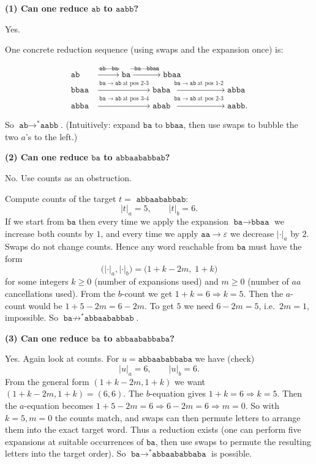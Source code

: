 \documentclass[12pt]{article}
\begin{document}
\bigskip

\textbf{(1) Can one reduce \(\texttt{ab}\) to \(\texttt{aabb}\)?}

Yes.

One concrete reduction sequence (using swaps and the expansion once) is:

\[
\begin{aligned}
\texttt{ab}
&\xrightarrow{\ \texttt{ab}\to\texttt{ba}\ } \texttt{ba} 
\xrightarrow{\ \texttt{ba}\to\texttt{bbaa}\ } \texttt{bbaa}\\
\texttt{bbaa}
&\xrightarrow{\ \texttt{ba}\to\texttt{ab}\ \text{at pos }2\text{-}3\ } \texttt{baba}
\xrightarrow{\ \texttt{ba}\to\texttt{ab}\ \text{at pos }1\text{-}2\ } \texttt{abba}\\
\texttt{abba}
&\xrightarrow{\ \texttt{ba}\to\texttt{ab}\ \text{at pos }3\text{-}4\ } \texttt{abab}
\xrightarrow{\ \texttt{ba}\to\texttt{ab}\ \text{at pos }2\text{-}3\ } \texttt{aabb}.
\end{aligned}
\]

So \(\texttt{ab}\to^{*}\texttt{aabb}\). (Intuitively: expand \(\texttt{ba}\) to \(\texttt{bbaa}\), then use swaps to bubble the two \(a\)'s to the left.)

\bigskip

\textbf{(2) Can one reduce \(\texttt{ba}\) to \(\texttt{abbaababbab}\)?}

No. Use counts as an obstruction.

Compute counts of the target \(t=\) \(\texttt{abbaababbab}\):
\[
|t|_a=5,\qquad |t|_b=6.
\]
If we start from \(\texttt{ba}\) then every time we apply the expansion \(\texttt{ba}\to\texttt{bbaa}\) we increase both counts by \(1\), and every time we apply \(\texttt{aa}\to\varepsilon\) we decrease \(|\cdot|_a\) by \(2\). Swaps do not change counts. Hence any word reachable from \(\texttt{ba}\) must have the form
\[
\big(|\cdot|_a,|\cdot|_b\big)
=\big(1+k-2m,\;1+k\big)
\]
for some integers \(k\ge0\) (number of expansions used) and \(m\ge0\) (number of \(aa\) cancellations used). From the \(b\)-count we get \(1+k=6\Rightarrow k=5\). Then the \(a\)-count would be \(1+5-2m=6-2m\). To get \(5\) we need \(6-2m=5\), i.e.\ \(2m=1\), impossible. So \(\texttt{ba}\not\to^{*}\texttt{abbaababbab}\).

\bigskip

\textbf{(3) Can one reduce \(\texttt{ba}\) to \(\texttt{abbaababbaba}\)?}

Yes. Again look at counts. For \(u=\texttt{abbaababbaba}\) we have (check)
\[
|u|_a=6,\qquad |u|_b=6.
\]
From the general form \((1+k-2m,1+k)\) we want \((1+k-2m,1+k)=(6,6)\). The \(b\)-equation gives \(1+k=6\Rightarrow k=5\). Then the \(a\)-equation becomes \(1+5-2m=6\Rightarrow 6-2m=6\Rightarrow m=0\). So with \(k=5,m=0\) the counts match, and swaps can then permute letters to arrange them into the exact target word. Thus a reduction exists (one can perform five expansions at suitable occurrences of \(\texttt{ba}\), then use swaps to permute the resulting letters into the target order). So \(\texttt{ba}\to^{*}\texttt{abbaababbaba}\) is possible.
\end{document}

